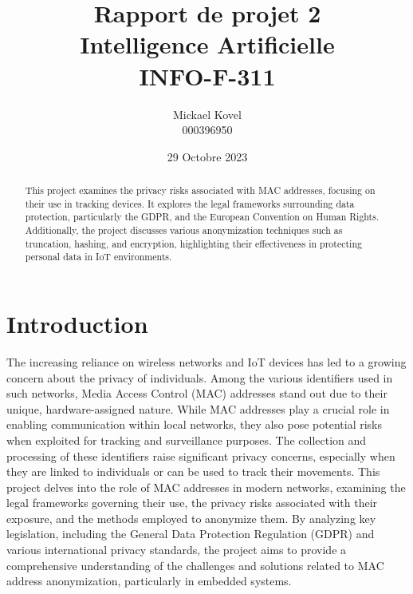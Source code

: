 \documentclass{article}
\begin{document}
\begin{figure}[t]
	\label{fig:ulbLogo}
\end{figure}
\author {Mickael Kovel\\000396950}
\date {29 Octobre 2023}
\title {Rapport de projet 2 \\
Intelligence Artificielle\\
INFO-F-311}
\maketitle
\begin{abstract}
This project examines the privacy risks associated with MAC addresses, focusing
on their use in tracking devices. It explores the legal frameworks surrounding 
data protection, particularly the GDPR, and the European Convention on Human Rights. 
Additionally, the project discusses various anonymization techniques such as truncation,
hashing, and encryption, highlighting their effectiveness in protecting personal data in
IoT environments.
\newpage
\end{abstract}
\tableofcontents
\newpage


\section{\label{sec:Intro}Introduction}

The increasing reliance on wireless networks and IoT devices has led to a 
growing concern about the privacy of individuals. Among the various identifiers 
used in such networks, Media Access Control (MAC) addresses stand out due to their 
unique, hardware-assigned nature. While MAC addresses play a crucial role in enabling 
communication within local networks, they also pose potential risks when exploited for 
tracking and surveillance purposes. The collection and processing of these identifiers 
raise significant privacy concerns, especially when they are linked to individuals or 
can be used to track their movements. This project delves into the role of MAC addresses 
in modern networks, examining the legal frameworks governing their use, the privacy risks
associated with their exposure, and the methods employed to anonymize them. By analyzing 
key legislation, including the General Data Protection Regulation (GDPR) and various 
international privacy standards, the project aims to provide a comprehensive understanding 
of the challenges and solutions related to MAC address anonymization, particularly in 
embedded systems.
\end{document}
